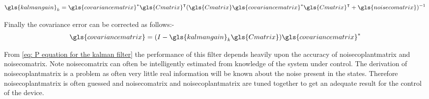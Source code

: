 \begin{equation}
\gls{kalmangain}_{k} = \gls{covariancematrix}^*\gls{Cmatrix}^{\intercal}(\gls{Cmatrix}\gls{covariancematrix}^*\gls{Cmatrix}^{\intercal} + \gls{noisecomatrix})^{-1}
\end{equation} 

Finally the covariance error can be corrected as follows:-
\begin{equation}
\gls{covariancematrix} = (I - \gls{kalmangain}_k\gls{Cmatrix})\gls{covariancematrix}^{*}
\end{equation}


From \eqref{eq: P equation for the kalman filter} the performance of this filter depends heavily upon the accuracy of \gls{noisecoplantmatrix} and \gls{noisecomatrix}. Note \gls{noisecomatrix} can often be intelligently estimated from knowledge of the system under control. The derivation of \gls{noisecoplantmatrix} is  a problem as often very little real information will be known about the noise present in the states.  Therefore \gls{noisecoplantmatrix} is often guessed and \gls{noisecomatrix} and \gls{noisecoplantmatrix} are tuned together to get an adequate result for the control of the device.
\begin{comment}
	\tikzset{%
	block/.style    = {draw, thick, rectangle, minimum height = 3em,minimum width = 3em},
	
	input/.style    = {coordinate}, %
	
	output/.style   = {coordinate} %

	block/.style    = {draw, thick, rectangle, minimum height = 3em,minimum width = 3em},

	gain/.style     = {draw, thick, isosceles triangle, minimum height = 2em,isosceles triangle apex angle=60},

	port/.style     = {inner sep=0pt, font=\tiny},
	
	sum/.style n args = {4}{draw, circle, node distance = 2cm, minimum size=5mm, alias=sum,
		append after command={
			node at (sum.north) [port, below=1pt] {$#1$}
			node at (sum.west) [port, right=1pt] {$#2$}
			node at (sum.south) [port, above=1pt] {$#3$}
			node at (sum.east) [port, left=1pt] {$#4$}
		},
	}, %
	
	joint/.style    = {circle, draw, fill, inner sep=0pt, minimum size=2pt},
	
}
\newcommand{\suma}{\Large$+$}
\newcommand{\inte}{$\displaystyle \int$}
\newcommand{\derv}{\huge$\frac{d}{dt}$}
\end{comment}

